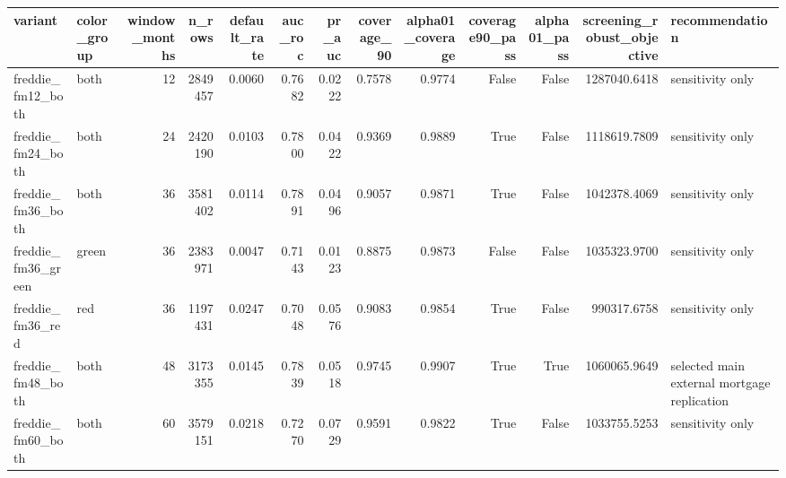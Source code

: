 \begin{tabular}{llrrrrrrrrrrl}
\toprule
variant & color\_group & window\_months & n\_rows & default\_rate & auc\_roc & pr\_auc & coverage\_90 & alpha01\_coverage & coverage90\_pass & alpha01\_pass & screening\_robust\_objective & recommendation \\
\midrule
freddie\_fm12\_both & both & 12 & 2849457 & 0.0060 & 0.7682 & 0.0222 & 0.7578 & 0.9774 & False & False & 1287040.6418 & sensitivity only \\
freddie\_fm24\_both & both & 24 & 2420190 & 0.0103 & 0.7800 & 0.0422 & 0.9369 & 0.9889 & True & False & 1118619.7809 & sensitivity only \\
freddie\_fm36\_both & both & 36 & 3581402 & 0.0114 & 0.7891 & 0.0496 & 0.9057 & 0.9871 & True & False & 1042378.4069 & sensitivity only \\
freddie\_fm36\_green & green & 36 & 2383971 & 0.0047 & 0.7143 & 0.0123 & 0.8875 & 0.9873 & False & False & 1035323.9700 & sensitivity only \\
freddie\_fm36\_red & red & 36 & 1197431 & 0.0247 & 0.7048 & 0.0576 & 0.9083 & 0.9854 & True & False & 990317.6758 & sensitivity only \\
freddie\_fm48\_both & both & 48 & 3173355 & 0.0145 & 0.7839 & 0.0518 & 0.9745 & 0.9907 & True & True & 1060065.9649 & selected main external mortgage replication \\
freddie\_fm60\_both & both & 60 & 3579151 & 0.0218 & 0.7270 & 0.0729 & 0.9591 & 0.9822 & True & False & 1033755.5253 & sensitivity only \\
\bottomrule
\end{tabular}
